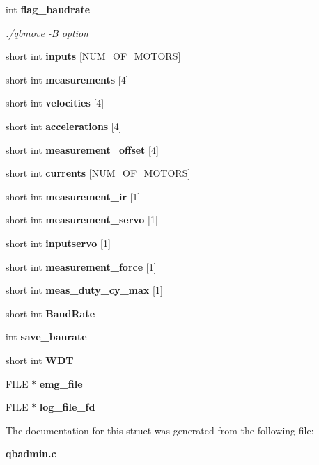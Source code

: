 \begin{DoxyCompactItemize}
\mbox{\label{structglobal__args_a9781d8e86f2d0d0414d313fec085d20e}} 
int \textbf{ flag\+\_\+baudrate}
\begin{DoxyCompactList}\small\item\em ./qbmove -\/B option \end{DoxyCompactList}\item 
\mbox{\label{structglobal__args_a5c5d83977377b63e3671b52680be11aa}} 
short int {\bfseries inputs} [N\+U\+M\+\_\+\+O\+F\+\_\+\+M\+O\+T\+O\+RS]
\item 
\mbox{\label{structglobal__args_a4c65d251aa919a9ae56d11639a748ccf}} 
short int {\bfseries measurements} [4]
\item 
\mbox{\label{structglobal__args_aa064f75f1bb48d252dabea993cd8c393}} 
short int {\bfseries velocities} [4]
\item 
\mbox{\label{structglobal__args_a6fe131122f89735be8fb030f8333e8c8}} 
short int {\bfseries accelerations} [4]
\item 
\mbox{\label{structglobal__args_a8e63e8b1dcf1ee3b6429110e26a7ef3d}} 
short int {\bfseries measurement\+\_\+offset} [4]
\item 
\mbox{\label{structglobal__args_aff0783d0bf2ae80eadc0c85a84db1549}} 
short int {\bfseries currents} [N\+U\+M\+\_\+\+O\+F\+\_\+\+M\+O\+T\+O\+RS]
\item 
\mbox{\label{structglobal__args_ad9b862535a2c85c9ca5f9b1b6f858f0e}} 
short int {\bfseries measurement\+\_\+ir} [1]
\item 
\mbox{\label{structglobal__args_a312ac8e2e59fa39822997368bdb4ad30}} 
short int {\bfseries measurement\+\_\+servo} [1]
\item 
\mbox{\label{structglobal__args_a47308e49ae17b1827646db852e731514}} 
short int {\bfseries inputservo} [1]
\item 
\mbox{\label{structglobal__args_ac5812e19901605235ea1a1fb8c79b695}} 
short int {\bfseries measurement\+\_\+force} [1]
\item 
\mbox{\label{structglobal__args_a7013a2c89b79b5e482f024f1eaa78b9b}} 
short int {\bfseries meas\+\_\+duty\+\_\+cy\+\_\+max} [1]
\item 
\mbox{\label{structglobal__args_a8f68c2db71004b2beac47c7ce6feb94c}} 
short int {\bfseries Baud\+Rate}
\item 
\mbox{\label{structglobal__args_a15a8bc4e37e5294ee939c1dd620095a8}} 
int {\bfseries save\+\_\+baurate}
\item 
\mbox{\label{structglobal__args_abd2a5fb7d2e58a98c4394067565b5492}} 
short int {\bfseries W\+DT}
\item 
\mbox{\label{structglobal__args_ac3ca959d3b7ae254f86531e0b82affcb}} 
F\+I\+LE $\ast$ {\bfseries emg\+\_\+file}
\item 
\mbox{\label{structglobal__args_a5fbba9db8f8d479d7607ec6e8617026a}} 
F\+I\+LE $\ast$ {\bfseries log\+\_\+file\+\_\+fd}
\end{DoxyCompactItemize}


The documentation for this struct was generated from the following file\+:\begin{DoxyCompactItemize}
\item 
\textbf{ qbadmin.\+c}\end{DoxyCompactItemize}
